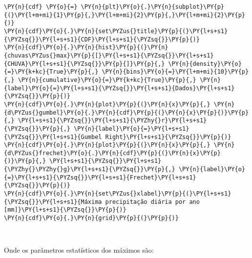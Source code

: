 \begin{tcolorbox}[breakable, size=fbox, boxrule=1pt, pad at break*=1mm,colback=cellbackground, colframe=cellborder]
\begin{Verbatim}[commandchars=\\\{\}]
\PY{n}{cdf} \PY{o}{=} \PY{n}{plt}\PY{o}{.}\PY{n}{subplot}\PY{p}{(}\PY{l+m+mi}{1}\PY{p}{,}\PY{l+m+mi}{2}\PY{p}{,}\PY{l+m+mi}{2}\PY{p}{)}
\PY{n}{cdf}\PY{o}{.}\PY{n}{set\PYZus{}title}\PY{p}{(}\PY{l+s+s1}{\PYZsq{}}\PY{l+s+s1}{CDF}\PY{l+s+s1}{\PYZsq{}}\PY{p}{)}
\PY{n}{cdf}\PY{o}{.}\PY{n}{hist}\PY{p}{(}\PY{n}{chuvas\PYZus{}max}\PY{p}{[}\PY{l+s+s1}{\PYZsq{}}\PY{l+s+s1}{CHUVA}\PY{l+s+s1}{\PYZsq{}}\PY{p}{]}\PY{p}{,} \PY{n}{density}\PY{o}{=}\PY{k+kc}{True}\PY{p}{,} \PY{n}{bins}\PY{o}{=}\PY{l+m+mi}{10}\PY{p}{,} \PY{n}{cumulative}\PY{o}{=}\PY{k+kc}{True}\PY{p}{,} \PY{n}{label}\PY{o}{=}\PY{l+s+s1}{\PYZsq{}}\PY{l+s+s1}{Dados}\PY{l+s+s1}{\PYZsq{}}\PY{p}{)}
\PY{n}{cdf}\PY{o}{.}\PY{n}{plot}\PY{p}{(}\PY{n}{x}\PY{p}{,} \PY{n}{d\PYZus{}gumbel}\PY{o}{.}\PY{n}{cdf}\PY{p}{(}\PY{n}{x}\PY{p}{)}\PY{p}{,} \PY{l+s+s1}{\PYZsq{}}\PY{l+s+s1}{\PYZhy{}r}\PY{l+s+s1}{\PYZsq{}}\PY{p}{,} \PY{n}{label}\PY{o}{=}\PY{l+s+s1}{\PYZsq{}}\PY{l+s+s1}{Gumbel Right}\PY{l+s+s1}{\PYZsq{}}\PY{p}{)}
\PY{n}{cdf}\PY{o}{.}\PY{n}{plot}\PY{p}{(}\PY{n}{x}\PY{p}{,} \PY{n}{d\PYZus{}frechet}\PY{o}{.}\PY{n}{cdf}\PY{p}{(}\PY{n}{x}\PY{p}{)}\PY{p}{,} \PY{l+s+s1}{\PYZsq{}}\PY{l+s+s1}{\PYZhy{}\PYZhy{}g}\PY{l+s+s1}{\PYZsq{}}\PY{p}{,} \PY{n}{label}\PY{o}{=}\PY{l+s+s1}{\PYZsq{}}\PY{l+s+s1}{Frechet}\PY{l+s+s1}{\PYZsq{}}\PY{p}{)}
\PY{n}{cdf}\PY{o}{.}\PY{n}{set\PYZus{}xlabel}\PY{p}{(}\PY{l+s+s1}{\PYZsq{}}\PY{l+s+s1}{Máxima precipitação diária por ano [mm]}\PY{l+s+s1}{\PYZsq{}}\PY{p}{)}
\PY{n}{cdf}\PY{o}{.}\PY{n}{grid}\PY{p}{(}\PY{p}{)}
\end{Verbatim}
\end{tcolorbox}

    \begin{center}
    \end{center}
    { \hspace*{\fill} \\}
    
    Onde os parâmetros estatísticos dos máximos são:

